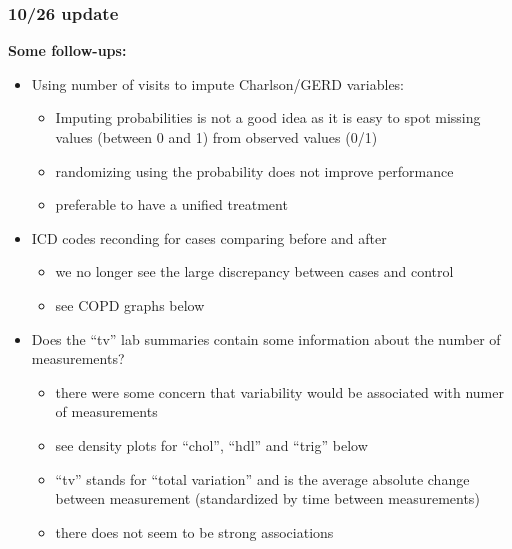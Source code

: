 \documentclass[12pt]{article}
\begin{document}
\pagebreak
\subsubsection*{10/26 update}

\textbf{Some follow-ups:}
\begin{itemize}
	\item Using number of visits to impute Charlson/GERD variables:
	\begin{itemize}
		\item Imputing probabilities is not a good idea as it is easy to spot missing values (between 0 and 1) from observed values (0/1)
		\item randomizing using the probability does not improve performance
		\item preferable to have a unified treatment
	\end{itemize}
	\item ICD codes reconding for cases comparing before and after
	\begin{itemize}
		\item we no longer see the large discrepancy between cases and control
		\item see COPD graphs below
	\end{itemize}
	\item Does the ``tv'' lab summaries contain some information about the number of measurements?
	\begin{itemize}
		\item there were some concern that variability would be associated with numer of measurements
		\item see density plots for ``chol'', ``hdl'' and ``trig'' below
		\item ``tv'' stands for ``total variation'' and is the average absolute  change between measurement (standardized by time between measurements)
		\item there does not seem to be strong associations
	\end{itemize}
\end{itemize}
\end{document}
